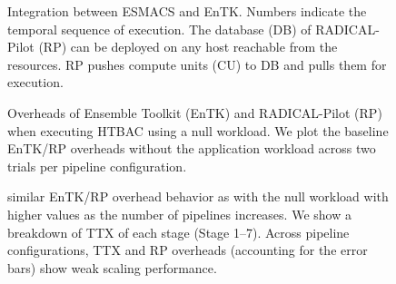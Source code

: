 \documentclass{bmcart}
\begin{document}
\begin{figure}[h!]
\caption{
  Integration between ESMACS and EnTK\@. Numbers indicate
  the temporal sequence of execution. The database (DB) of RADICAL-Pilot (RP)
  can be deployed on any host reachable from the resources. RP pushes compute
  units (CU) to DB and pulls them for execution.}
  \label{figure:ht-bac_rp}
  \end{figure}


\begin{figure}[h!]
\caption{
  Overheads of Ensemble Toolkit (EnTK) and RADICAL-Pilot (RP) when
  executing HTBAC using a null workload. We plot the baseline
  EnTK/RP overheads without the application workload across two
  trials per pipeline configuration.}\label{fig:exp1}
  \end{figure}


\begin{figure}[h!]
\caption{
  similar EnTK/RP overhead behavior as with the null workload with higher
  values as the number of pipelines increases. We show a breakdown of TTX of
  each stage (Stage 1--7). Across pipeline configurations, TTX and RP
  overheads (accounting for the error bars) show weak scaling
  performance.}
  \label{fig:exp2}
  \end{figure}
\end{document}
